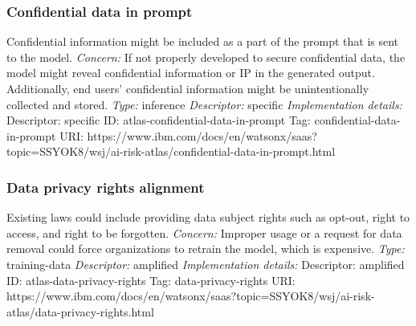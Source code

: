 \documentclass{article}
\begin{document}
\subsubsection*{Confidential data in prompt}
Confidential information might be included as a part of the prompt that is sent to the model.\newline
\textit{Concern: }If not properly developed to secure confidential data, the model might reveal confidential information or IP in the generated output. Additionally, end users' confidential information might be unintentionally collected and stored.\newline\newline
\textit{Type: }inference\newline
\textit{Descriptor: }specific \newline\newline
\textit{Implementation details:} \newline
Descriptor: specific \newline
ID: atlas-confidential-data-in-prompt \newline
Tag: confidential-data-in-prompt \newline
URI:  https://www.ibm.com/docs/en/watsonx/saas?topic=SSYOK8/wsj/ai-risk-atlas/confidential-data-in-prompt.html\newline
\subsubsection*{Data privacy rights alignment}
Existing laws could include providing data subject rights such as opt-out, right to access, and right to be forgotten.\newline
\textit{Concern: }Improper usage or a request for data removal could force organizations to retrain the model, which is expensive.\newline\newline
\textit{Type: }training-data\newline
\textit{Descriptor: }amplified \newline\newline
\textit{Implementation details:} \newline
Descriptor: amplified \newline
ID: atlas-data-privacy-rights \newline
Tag: data-privacy-rights \newline
URI:  https://www.ibm.com/docs/en/watsonx/saas?topic=SSYOK8/wsj/ai-risk-atlas/data-privacy-rights.html\newline
\end{document}
